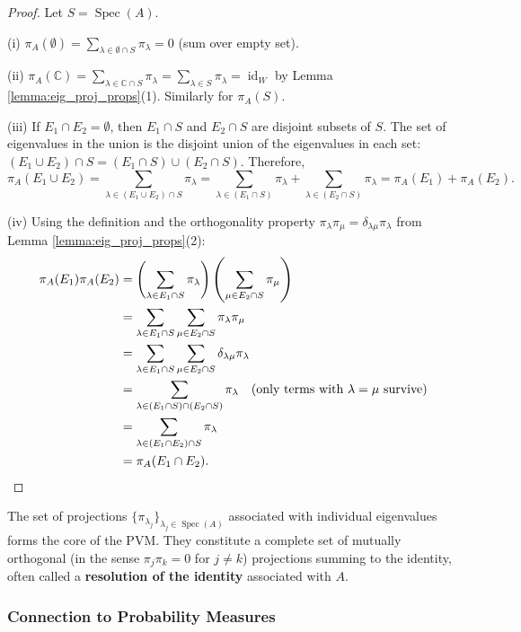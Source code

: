 \begin{proof}
Let $S = \operatorname{Spec}(A)$.

(i) $\pi_A(\emptyset) = \sum_{\lambda \in \emptyset \cap S} \pi_\lambda = 0$ (sum over empty set).

(ii) $\pi_A(\mathbb{C}) = \sum_{\lambda \in \mathbb{C} \cap S} \pi_\lambda = \sum_{\lambda \in S} \pi_\lambda = \operatorname{id}_W$ by Lemma \ref{lemma:eig_proj_props}(1). Similarly for $\pi_A(S)$.

(iii) If $E_1 \cap E_2 = \emptyset$, then $E_1 \cap S$ and $E_2 \cap S$ are disjoint subsets of $S$. The set of eigenvalues in the union is the disjoint union of the eigenvalues in each set: $(E_1 \cup E_2) \cap S = (E_1 \cap S) \cup (E_2 \cap S)$. Therefore,
    \[ \pi_A(E_1 \cup E_2) = \sum_{\lambda \in (E_1 \cup E_2) \cap S} \pi_\lambda = \sum_{\lambda \in (E_1 \cap S)} \pi_\lambda + \sum_{\lambda \in (E_2 \cap S)} \pi_\lambda = \pi_A(E_1) + \pi_A(E_2). \]

(iv) Using the definition and the orthogonality property $\pi_\lambda \pi_\mu = \delta_{\lambda\mu} \pi_\lambda$ from Lemma \ref{lemma:eig_proj_props}(2):
\begin{align*} \pi_A(E_1) \pi_A(E_2) &= \left( \sum_{\lambda \in E_1 \cap S} \pi_\lambda \right) \left( \sum_{\mu \in E_2 \cap S} \pi_\mu \right) \\ &= \sum_{\lambda \in E_1 \cap S} \sum_{\mu \in E_2 \cap S} \pi_\lambda \pi_\mu \\ &= \sum_{\lambda \in E_1 \cap S} \sum_{\mu \in E_2 \cap S} \delta_{\lambda\mu} \pi_\lambda \\ &= \sum_{\lambda \in (E_1 \cap S) \cap (E_2 \cap S)} \pi_\lambda \quad (\text{only terms with } \lambda=\mu \text{ survive}) \\ &= \sum_{\lambda \in (E_1 \cap E_2) \cap S} \pi_\lambda \\ &= \pi_A(E_1 \cap E_2). \qedhere \end{align*}
\end{proof}

The set of projections $\{\pi_{\lambda_j}\}_{\lambda_j \in \operatorname{Spec}(A)}$ associated with individual eigenvalues forms the core of the PVM. They constitute a complete set of mutually orthogonal (in the sense $\pi_j \pi_k = 0$ for $j \neq k$) projections summing to the identity, often called a \textbf{resolution of the identity} associated with $A$.

\subsubsection{Connection to Probability Measures}

